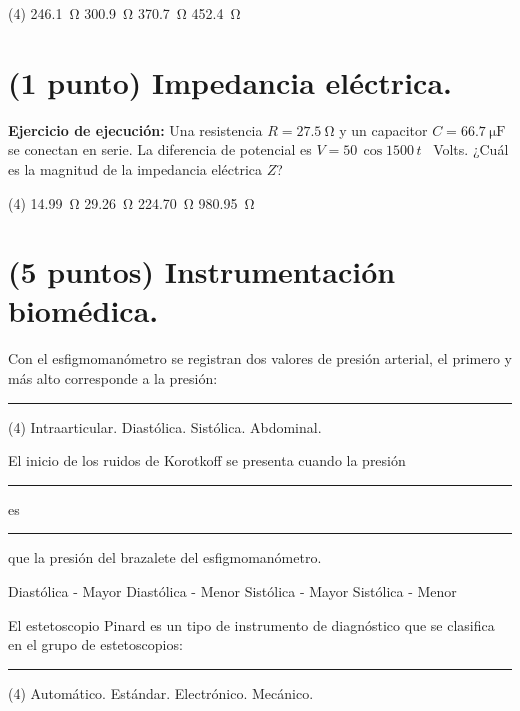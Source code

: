 \documentclass[12pt, letter]{exam}
\begin{document}
\begin{questions}
    \vspace{0.3cm}
    \begin{tasks}(4)
        \task \SI{246.1}{\ohm}
        \task \SI{300.9}{\ohm}
        \task \SI{370.7}{\ohm}
        \task \SI{452.4}{\ohm}
    \end{tasks}

    \section{(1 punto) Impedancia eléctrica.}

    \question \label{Ejercicio_13} \textbf{Ejercicio de ejecución: } Una resistencia $R = \SI{27.5}{\ohm}$ y un capacitor $C = \SI{66.7}{\micro\farad}$ se conectan en serie. La diferencia de potencial es $V = \num{50} \, \cos 1500 \, t$ \, Volts. ¿Cuál es la magnitud de la impedancia eléctrica $Z$?
    \begin{tasks}(4)
        \task \SI{14.99}{\ohm}
        \task \SI{29.26}{\ohm}
        \task \SI{224.70}{\ohm}
        \task \SI{980.95}{\ohm}
    \end{tasks}

    \section{(5 puntos) Instrumentación biomédica.}

    \question Con el esfigmomanómetro se registran dos valores de presión arterial, el primero y más alto corresponde a la presión: \rule{2cm}{0.1mm}
    \begin{tasks}(4)
        \task Intraarticular.
        \task Diastólica.
        \task Sistólica.
        \task Abdominal.
    \end{tasks}
    \question El inicio de los ruidos de Korotkoff se presenta cuando la presión \rule{2cm}{0.1mm} es \rule{2cm}{0.1mm} que la presión del brazalete del esfigmomanómetro.
    \begin{multicols}{2}
    \begin{tasks}
        \task Diastólica - Mayor
        \task Diastólica - Menor
        \task Sistólica - Mayor
        \task Sistólica - Menor
    \end{tasks}
    \end{multicols}
    \question El estetoscopio Pinard es un tipo de instrumento de diagnóstico que se clasifica en el grupo de estetoscopios: \rule{2cm}{0.1mm}
    \begin{tasks}(4)
        \task Automático.
        \task Estándar.
        \task Electrónico.
        \task Mecánico.
    \end{tasks}
   

\end{questions}
\end{document}
